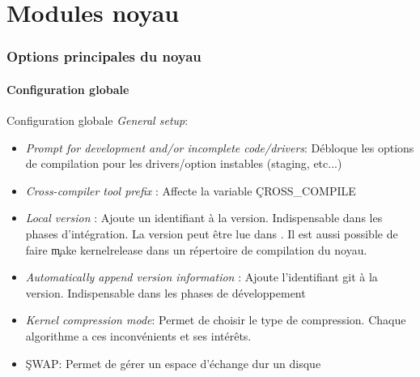 %
%

\part{Modules noyau}

\begin{frame}
  \partpage
\end{frame}

\begin{frame}
  \tableofcontents[currentpart]
\end{frame}


\section{Options principales du noyau}

\subsection{Configuration globale}

\begin{frame}[fragile=singleslide]{Configuration globale}
  \emph{General setup}:
  \begin{itemize} 
  \item \emph{Prompt for  development and/or incomplete code/drivers}:
    Débloque  les  options  de  compilation  pour  les  drivers/option
    instables (staging, etc...)
  \item  \emph{Cross-compiler  tool  prefix}  :  Affecte  la  variable
    \c{CROSS_COMPILE}
  \item   \emph{Local  version}   :   Ajoute  un   identifiant  à   la
    version. Indispensable  dans les phases  d'intégration. La version
    peut être lue dans  . Il est aussi possible de
    faire \c{make kernelrelease} dans  un répertoire de compilation du
    noyau.
  \item  \emph{Automatically  append  version  information}  :  Ajoute
    l'identifiant git  à la version. Indispensable dans  les phases de
    développement
  \item \emph{Kernel  compression mode}: Permet de choisir  le type de
    compression.   Chaque  algorithme   a  ces  inconvénients  et  ses
    intérêts.
  \item \c{SWAP}: Permet de gérer un espace d'échange dur un disque
  \end{itemize}
\end{frame}

